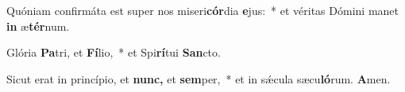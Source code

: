 \item Quóniam confirmáta est super nos miseri\textbf{cór}dia \textbf{e}jus:~* et véritas Dómini manet \textbf{in} æ\textbf{tér}num.
\item Glória \textbf{Pa}tri, et \textbf{Fí}lio,~* et Spi\textbf{rí}tui \textbf{San}cto.
\item Sicut erat in princípio, et \textbf{nunc,} et \textbf{sem}per,~* et in sǽcula sæcu\textbf{ló}rum. \textbf{A}men.
